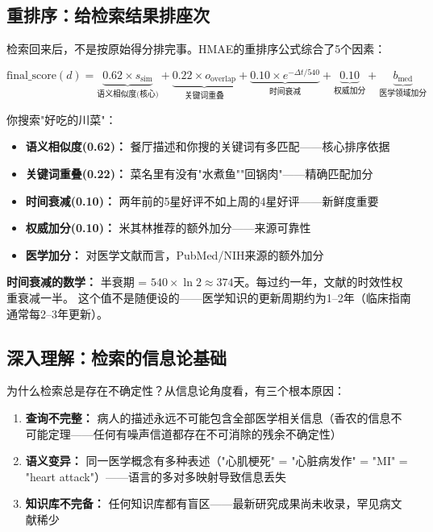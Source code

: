 \documentclass[11pt,a4paper]{ctexart}
\begin{document}
\subsection{重排序：给检索结果排座次}

检索回来后，不是按原始得分排完事。HMAE的重排序公式综合了5个因素：

$$\text{final\_score}(d) = \underbrace{0.62 \times s_{\text{sim}}}_{\text{语义相似度(核心)}} + \underbrace{0.22 \times o_{\text{overlap}}}_{\text{关键词重叠}} + \underbrace{0.10 \times e^{-\Delta t/540}}_{\text{时间衰减}} + \underbrace{0.10}_{\text{权威加分}} + \underbrace{b_{\text{med}}}_{\text{医学领域加分}}$$

\begin{exambox}
你搜索"好吃的川菜"：
\begin{itemize}[nosep]
\item \textbf{语义相似度(0.62)：} 餐厅描述和你搜的关键词有多匹配——核心排序依据
\item \textbf{关键词重叠(0.22)：} 菜名里有没有"水煮鱼""回锅肉"——精确匹配加分
\item \textbf{时间衰减(0.10)：} 两年前的5星好评不如上周的4星好评——新鲜度重要
\item \textbf{权威加分(0.10)：} 米其林推荐的额外加分——来源可靠性
\item \textbf{医学加分：} 对医学文献而言，PubMed/NIH来源的额外加分
\end{itemize}
\end{exambox}

\textbf{时间衰减的数学：} 半衰期 = $540 \times \ln 2 \approx 374$天。每过约一年，文献的时效性权重衰减一半。
这个值不是随便设的——医学知识的更新周期约为1--2年（临床指南通常每2--3年更新）。

\subsection{深入理解：检索的信息论基础}

为什么检索总是存在不确定性？从信息论角度看，有三个根本原因：

\begin{enumerate}[nosep]
\item \textbf{查询不完整：} 病人的描述永远不可能包含全部医学相关信息（香农的信息不可能定理——任何有噪声信道都存在不可消除的残余不确定性）
\item \textbf{语义变异：} 同一医学概念有多种表述（"心肌梗死" = "心脏病发作" = "MI" = "heart attack"）——语言的多对多映射导致信息丢失
\item \textbf{知识库不完备：} 任何知识库都有盲区——最新研究成果尚未收录，罕见病文献稀少
\end{enumerate}
\end{document}
